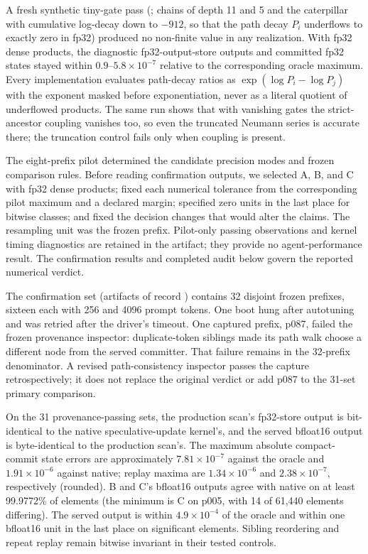\documentclass[conference]{IEEEtran}
\begin{document}
A fresh synthetic tiny-gate pass (; chains of depth 11 and 5 and the caterpillar with cumulative log-decay down to $-912$, so that the path decay $P_i$ underflows to exactly zero in fp32) produced no non-finite value in any realization. With fp32 dense products, the diagnostic fp32-output-store outputs and committed fp32 states stayed within $0.9$--$5.8\times10^{-7}$ relative to the corresponding oracle maximum. Every implementation evaluates path-decay ratios as $\exp(\log P_i-\log P_j)$ with the exponent masked before exponentiation, never as a literal quotient of underflowed products. The same run shows that with vanishing gates the strict-ancestor coupling vanishes too, so even the truncated Neumann series is accurate there; the truncation control fails only when coupling is present.

The eight-prefix pilot determined the candidate precision modes and frozen comparison rules. Before reading confirmation outputs, we selected A, B, and C with fp32 dense products; fixed each numerical tolerance from the corresponding pilot maximum and a declared margin; specified zero units in the last place for bitwise classes; and fixed the decision changes that would alter the claims. The resampling unit was the frozen prefix. Pilot-only passing observations and kernel timing diagnostics are retained in the artifact; they provide no agent-performance result. The confirmation results and completed audit below govern the reported numerical verdict.

The confirmation set (artifacts of record ) contains 32 disjoint frozen prefixes, sixteen each with 256 and 4096 prompt tokens. One boot hung after autotuning and was retried after the driver's timeout. One captured prefix, p087, failed the frozen provenance inspector: duplicate-token siblings made its path walk choose a different node from the served committer. That failure remains in the 32-prefix denominator. A revised path-consistency inspector passes the capture retrospectively; it does not replace the original verdict or add p087 to the 31-set primary comparison.

On the 31 provenance-passing sets, the production scan's fp32-store output is bit-identical to the native speculative-update kernel's, and the served bfloat16 output is byte-identical to the production scan's. The maximum absolute compact-commit state errors are approximately $7.81\times10^{-7}$ against the oracle and $1.91\times10^{-6}$ against native; replay maxima are $1.34\times10^{-6}$ and $2.38\times10^{-7}$, respectively (rounded). B and C's bfloat16 outputs agree with native on at least 99.9772\% of elements (the minimum is C on p005, with 14 of 61,440 elements differing). The served output is within $4.9\times10^{-4}$ of the oracle and within one bfloat16 unit in the last place on significant elements. Sibling reordering and repeat replay remain bitwise invariant in their tested controls.
\end{document}
